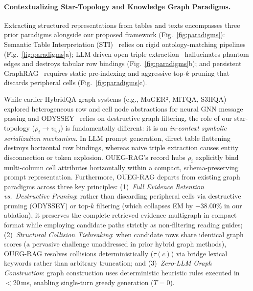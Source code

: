 \documentclass[runningheads]{llncs}
\begin{document}
\paragraph{Contextualizing Star-Topology and Knowledge Graph Paradigms.}
Extracting structured representations from tables and texts encompasses three prior paradigms alongside our proposed framework (Fig.~\ref{fig:paradigms}): Semantic Table Interpretation (STI)~\cite{ritze2016matching,deng2020turl} relies on rigid ontology-matching pipelines (Fig.~\ref{fig:paradigms}a); LLM-driven open triple extraction~\cite{edge2024graphrag,pan2024unifying} hallucinates phantom edges and destroys tabular row bindings (Fig.~\ref{fig:paradigms}b); and persistent GraphRAG~\cite{edge2024graphrag,tan2025hydrarag,peng2024graphragsurvey} requires static pre-indexing and aggressive top-$k$ pruning that discards peripheral cells (Fig.~\ref{fig:paradigms}c).

While earlier HybridQA graph systems (e.g., MuGER², MITQA, S3HQA) explored heterogeneous row and cell node abstractions for neural GNN message passing and ODYSSEY~\cite{agarwal2025hybrid} relies on destructive graph filtering, the role of our star-topology ($\rho_i \rightarrow v_{i,j}$) is fundamentally different: it is an \emph{in-context symbolic serialization mechanism}. In LLM prompt generation, direct table flattening destroys horizontal row bindings, whereas naive triple extraction causes entity disconnection or token explosion. OUEG-RAG's record hubs $\rho_i$ explicitly bind multi-column cell attributes horizontally within a compact, schema-preserving prompt representation. Furthermore, OUEG-RAG departs from existing graph paradigms across three key principles: (1)~\emph{Full Evidence Retention vs.\ Destructive Pruning}: rather than discarding peripheral cells via destructive pruning (ODYSSEY) or top-$k$ filtering (which collapses EM by $-38.00\%$ in our ablation), it preserves the complete retrieved evidence multigraph in compact format while employing candidate paths strictly as non-filtering reading guides; (2)~\emph{Structural Collision Tiebreaking}: when candidate rows share identical graph scores (a pervasive challenge unaddressed in prior hybrid graph methods), OUEG-RAG resolves collisions deterministically ($\tau(c)$) via bridge lexical keywords rather than arbitrary truncation; and (3)~\emph{Zero-LLM Graph Construction}: graph construction uses deterministic heuristic rules executed in $<20$\,ms, enabling single-turn greedy generation ($T=0$).
\end{document}
